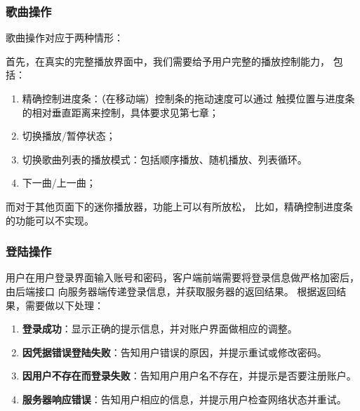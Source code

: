 \subsubsection{歌曲操作} %
\label{ssub:歌曲操作}
歌曲操作对应于两种情形：

首先，在真实的完整播放界面中，我们需要给予用户完整的播放控制能力，
包括：
\begin{enumerate}
    \item 精确控制进度条：（在移动端）控制条的拖动速度可以通过
    触摸位置与进度条的相对垂直距离来控制，具体要求见第七章；
    \item 切换播放/暂停状态；
    \item 切换歌曲列表的播放模式：包括顺序播放、随机播放、列表循环。
    \item 下一曲/上一曲；
\end{enumerate}

而对于其他页面下的迷你播放器，功能上可以有所放松，
比如，精确控制进度条的功能可以不实现。

\subsubsection{登陆操作} %
\label{ssub:登陆操作}
用户在用户登录界面输入账号和密码，客户端前端需要将登录信息做严格加密后，由后端接口
向服务器端传递登录信息，并获取服务器的返回结果。
根据返回结果，需要做以下处理：
\begin{enumerate}
    \item \textbf{登录成功}：显示正确的提示信息，并对账户界面做相应的调整。
    \item \textbf{因凭据错误登陆失败}：告知用户错误的原因，并提示重试或修改密码。
    \item \textbf{因用户不存在而登录失败}：告知用户用户名不存在，并提示是否要注册账户。
    \item \textbf{服务器响应错误}：告知用户相应的信息，并提示用户检查网络状态并重试。
\end{enumerate}

